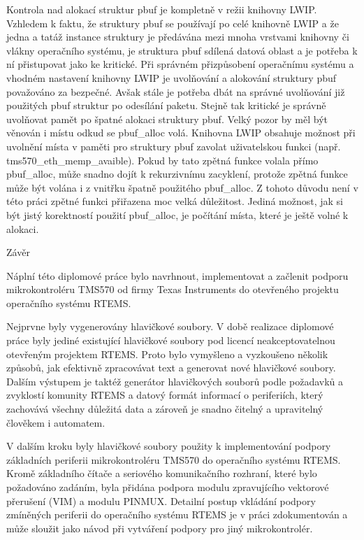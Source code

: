 Kontrola nad alokací struktur pbuf je kompletně v režii knihovny LWIP.
Vzhledem k faktu, že struktury pbuf se používají po celé knihovně LWIP a že jedna a tatáž instance struktury je předávána mezi mnoha vrstvami knihovny či vlákny operačního systému, je struktura pbuf sdílená datová oblast a je potřeba k ní přistupovat jako ke kritické.
Při správném přizpůsobení operačnímu systému a vhodném nastavení knihovny LWIP je uvolňování a alokování struktury pbuf považováno za bezpečné.
Avšak stále je potřeba dbát na správné uvolňování již použitých pbuf struktur po odesílání paketu.
Stejně tak kritické je správně uvolňovat pamět po špatné alokaci struktury pbuf.
Velký pozor by měl být věnován i místu odkud se pbuf\_alloc volá.
Knihovna LWIP obsahuje možnost při uvolnění místa v paměti pro struktury pbuf zavolat uživatelskou funkci (např. tms570\_eth\_memp\_avaible).{}
 Pokud by tato zpětná funkce volala přímo pbuf\_alloc, může snadno dojít k rekurzivnímu zacyklení, protože zpětná funkce může být volána i z vnitřku špatně použitého pbuf\_alloc.
Z tohoto důvodu není v této práci zpětné funkci přiřazena moc velká důležitost.
Jediná možnost, jak si být jistý korektností použití pbuf\_alloc, je počítání místa, které je ještě volné k alokaci.

\chap Závěr

Náplní této diplomové práce bylo navrhnout, implementovat a začlenit podporu mikrokontroléru TMS570 od firmy Texas Instruments do otevřeného projektu operačního systému RTEMS.

\medskip

Nejprvne byly vygenerovány hlavičkové soubory.
V době realizace diplomové práce byly jediné existující hlavičkové soubory pod licencí neakceptovatelnou otevřeným projektem RTEMS.
Proto bylo vymyšleno a vyzkoušeno několik způsobů, jak efektivně zpracovávat text a generovat nové hlavičkové soubory.
Dalším výstupem je taktéž generátor hlavičkových souborů podle požadavků a zvyklostí komunity RTEMS a datový formát informací o periferiích, který zachovává všechny důležitá data a zároveň je snadno čitelný a upravitelný člověkem i automatem.

V dalším kroku byly hlavičkové soubory použity k implementování podpory základních periferii mikrokontroléru TMS570 do operačního systému RTEMS.
Kromě základního čítače a seriového komunikačního rozhraní, které bylo požadováno zadáním, byla přidána podpora modulu zpravujícího vektorové přerušení (VIM) a modulu PINMUX.
Detailní postup vkládání podpory zmíněných periferii do operačního systému RTEMS je v práci zdokumentován a může sloužit jako návod při vytváření podpory pro jiný mikrokontrolér.

